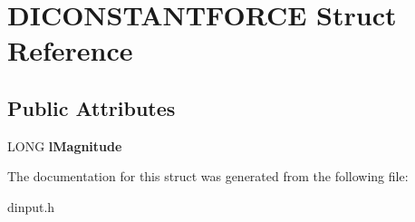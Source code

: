 \hypertarget{struct_d_i_c_o_n_s_t_a_n_t_f_o_r_c_e}{\section{D\-I\-C\-O\-N\-S\-T\-A\-N\-T\-F\-O\-R\-C\-E Struct Reference}
\label{struct_d_i_c_o_n_s_t_a_n_t_f_o_r_c_e}
}
\subsection*{Public Attributes}
\begin{DoxyCompactItemize}
\item 
\hypertarget{struct_d_i_c_o_n_s_t_a_n_t_f_o_r_c_e_acd4398bd51436ca93853bcd4acae10ac}{L\-O\-N\-G {\bfseries l\-Magnitude}}\label{struct_d_i_c_o_n_s_t_a_n_t_f_o_r_c_e_acd4398bd51436ca93853bcd4acae10ac}

\end{DoxyCompactItemize}


The documentation for this struct was generated from the following file\-:\begin{DoxyCompactItemize}
\item 
dinput.\-h\end{DoxyCompactItemize}
